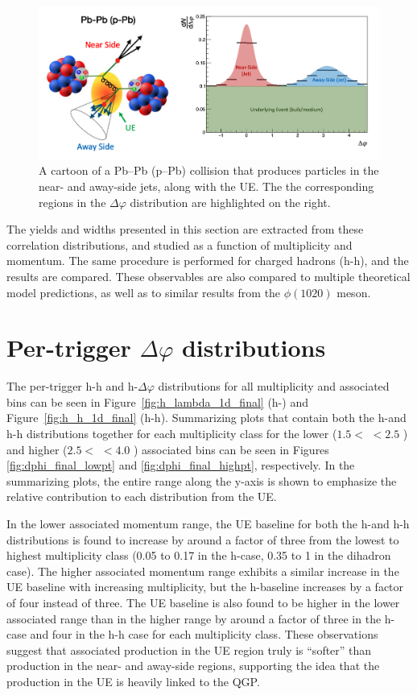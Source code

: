 \begin{figure}[h]
\centering
\includegraphics[width=\textwidth]{figures/mnm/dphi_cartoon.png}
\caption{A cartoon of a Pb--Pb (p--Pb) collision that produces particles in the near- and away-side jets, along with the UE. The the corresponding regions in the $\Delta\varphi$ distribution are highlighted on the right.}
\label{fig:dphi_cartoon_ref}
\end{figure}

The yields and widths presented in this section are extracted from these correlation distributions, and studied as a function of multiplicity and \lmb momentum. The same procedure is performed for charged hadrons (h-h), and the results are compared. These observables are also compared to multiple theoretical model predictions, as well as to similar results from the $\phi(1020)$ meson.

\section{Per-trigger $\Delta\varphi$ distributions}

The per-trigger h-h and h-\lmb $\Delta\varphi$ distributions for all multiplicity and associated \pt bins can be seen in Figure~\ref{fig:h_lambda_1d_final} (h-\lmb) and Figure~\ref{fig:h_h_1d_final} (h-h). Summarizing plots that contain both the h-\lmb and h-h distributions together for each multiplicity class for the lower ($1.5 <$ \pt $< 2.5$ \GeVc) and higher ($2.5 < $ \pt $< 4.0$ \GeVc) associated \pt bins can be seen in Figures \ref{fig:dphi_final_lowpt} and \ref{fig:dphi_final_highpt}, respectively. In the summarizing plots, the entire range along the y-axis is shown to emphasize the relative contribution to each distribution from the UE. 

In the lower associated momentum range, the UE baseline for both the h-\lmb and h-h distributions is found to increase by around a factor of three from the lowest to highest multiplicity class (0.05 to 0.17 in the h-\lmb case, 0.35 to 1 in the dihadron case). The higher associated momentum range exhibits a similar increase in the UE baseline with increasing multiplicity, but the h-\lmb baseline increases by a factor of four instead of three. The UE baseline is also found to be higher in the lower associated \pt range than in the higher range by around a factor of three in the h-\lmb case and four in the h-h case for each multiplicity class. These observations suggest that associated production in the UE region truly is ``softer'' than production in the near- and away-side regions, supporting the idea that the production in the UE is heavily linked to the QGP.

